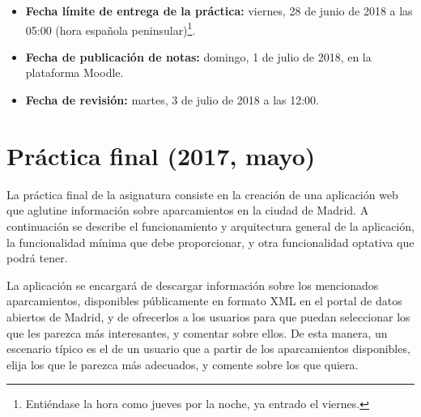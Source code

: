 \begin{itemize}
  \item \textbf{Fecha límite de entrega de la práctica:} viernes, 28 de junio de 2018 a las 05:00 (hora española peninsular)\footnote{Entiéndase la hora como jueves por la noche, ya entrado el viernes.}.

  \item \textbf{Fecha de publicación de notas:} domingo, 1 de julio de 2018, en la plataforma Moodle.

  \item \textbf{Fecha de revisión:} martes, 3 de julio de 2018 a las 12:00.
\end{itemize}


\newpage

\newpage

\section{Práctica final (2017, mayo)}
\label{practica-final-2017-05}

La práctica final de la asignatura consiste en la creación de una aplicación web que aglutine información sobre aparcamientos en la ciudad de Madrid. A continuación se describe el funcionamiento y arquitectura general de la aplicación, la funcionalidad mínima que debe proporcionar, y otra funcionalidad optativa que podrá tener.

La aplicación se encargará de descargar información sobre los mencionados aparcamientos, disponibles públicamente en formato XML en el portal de datos abiertos de Madrid, y de ofrecerlos a los usuarios para que puedan seleccionar los que les parezca más interesantes, y comentar sobre ellos. De esta manera, un escenario típico es el de un usuario que a partir de los aparcamientos disponibles, elija los que le parezca más adecuados, y comente sobre los que quiera.

